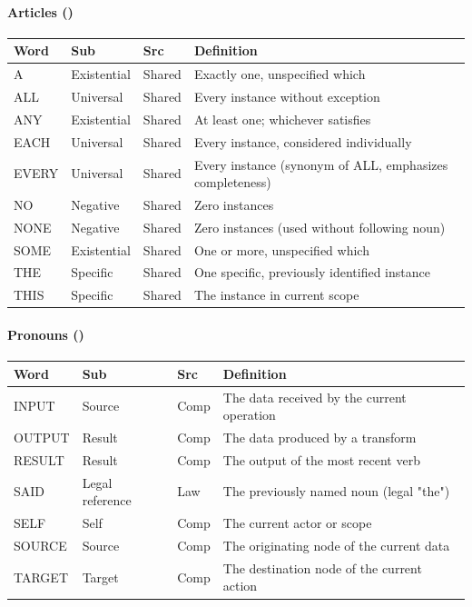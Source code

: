 \documentclass{article}
\begin{document}
\paragraph{Articles (\VocabArticles)}
\small
\begin{tabular}{lllp{7cm}}
\toprule \textbf{Word} & \textbf{Sub} & \textbf{Src} & \textbf{Definition} \\ \midrule
A & Existential & Shared & Exactly one, unspecified which \\
ALL & Universal & Shared & Every instance without exception \\
ANY & Existential & Shared & At least one; whichever satisfies \\
EACH & Universal & Shared & Every instance, considered individually \\
EVERY & Universal & Shared & Every instance (synonym of ALL, emphasizes completeness) \\
NO & Negative & Shared & Zero instances \\
NONE & Negative & Shared & Zero instances (used without following noun) \\
SOME & Existential & Shared & One or more, unspecified which \\
THE & Specific & Shared & One specific, previously identified instance \\
THIS & Specific & Shared & The instance in current scope \\
\bottomrule
\end{tabular}
\normalsize

\paragraph{Pronouns (\VocabPronouns)}
\small
\begin{tabular}{lllp{7cm}}
\toprule \textbf{Word} & \textbf{Sub} & \textbf{Src} & \textbf{Definition} \\ \midrule
INPUT & Source & Comp & The data received by the current operation \\
OUTPUT & Result & Comp & The data produced by a transform \\
RESULT & Result & Comp & The output of the most recent verb \\
SAID & Legal reference & Law & The previously named noun (legal "the") \\
SELF & Self & Comp & The current actor or scope \\
SOURCE & Source & Comp & The originating node of the current data \\
TARGET & Target & Comp & The destination node of the current action \\
\bottomrule
\end{tabular}
\normalsize
\end{document}

